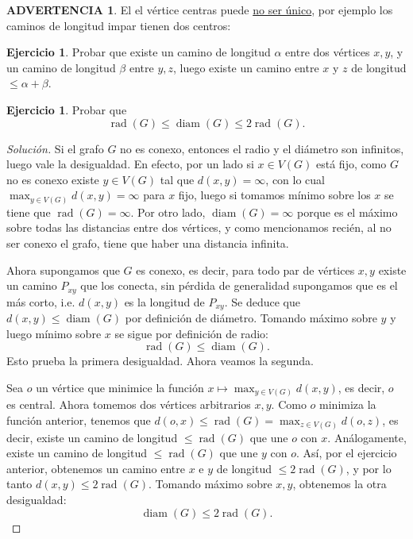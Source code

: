 \documentclass[12pt]{report}
\theoremstyle{plain}
\theoremstyle{definition}
\newtheorem{warn}[theorem]{\textbf{ADVERTENCIA}}
\renewenvironment{warning}{\begin{warn}}{\end{warn}}
\newtheorem{exercise}[theorem]{Ejercicio}
\newenvironment{solution}{\begin{proof}[Solución]}{\end{proof}}
\newenvironment{Warning}{\colorlet{shadecolor}{red!12} \begin{shaded} \begin{warning}}{ \end{warning} \end{shaded}}
\newcommand{\diam}[1]{\operatorname{diam} (#1)}
\newcommand{\rad}[1]{\operatorname{rad}(#1)}
\begin{document}

\begin{Warning}
El el vértice centras puede \underline{no ser único}, por ejemplo los caminos de longitud impar tienen dos centros:
\end{Warning}

\begin{exercise}
Probar que existe un camino de longitud $\alpha$ entre dos vértices $x,y$, y un camino de longitud $\beta$ entre $y,z$, luego existe un camino entre $x$ y $z$ de longitud $\leq \alpha + \beta$.
\end{exercise}

\begin{exercise}
Probar que
$$
\rad G \leq \diam G \leq 2 \rad G .
$$
\end{exercise}
\begin{solution}
Si el grafo $G$ no es conexo, entonces el radio y el diámetro son infinitos, luego vale la desigualdad. En efecto, por un lado si $x \in V(G)$ está fijo, como $G$ no es conexo existe $y \in V(G)$ tal que $d (x,y) = \infty$, con lo cual $\max_{y \in V(G)} d(x,y) = \infty$ para $x$ fijo, luego si tomamos mínimo sobre los $x$ se tiene que $\rad G = \infty$. Por otro lado, $\diam G = \infty$ porque es el máximo sobre todas las distancias entre dos vértices, y como mencionamos recién, al no ser conexo el grafo, tiene que haber una distancia infinita.

Ahora supongamos que $G$ es conexo, es decir, para todo par de vértices $x,y$ existe un camino $P_{xy}$ que los conecta, sin pérdida de generalidad supongamos que es el más corto, i.e. $d(x,y)$ es la longitud de $P_{xy}$. Se deduce que $d(x,y) \leq \diam G$ por definición de diámetro. Tomando máximo sobre $y$ y luego mínimo sobre $x$ se sigue por definición de radio:
$$
\rad G \leq \diam G.
$$
Esto prueba la primera desigualdad. Ahora veamos la segunda.

Sea $o$ un vértice que minimice la función $x \mapsto \max_{y \in V(G)} d(x,y)$, es decir, $o$ es central. Ahora tomemos dos vértices arbitrarios $x,y$. Como $o$  minimiza la función anterior, tenemos que $d(o,x) \leq \rad G = \max_{z \in V(G)} d(o,z)$, es decir, existe un camino de longitud $\leq \rad G$ que une $o$ con $x$. Análogamente, existe un camino de longitud $\leq \rad G$ que une $y$ con $o$. Así, por el ejercicio anterior, obtenemos un camino entre $x$ e $y$ de longitud $\leq 2 \rad G$, y por lo tanto $d(x,y) \leq 2 \rad G$. Tomando máximo sobre $x,y$, obtenemos la otra desigualdad:
$$
\diam G \leq 2 \rad G.
$$
\end{solution}
\end{document}
